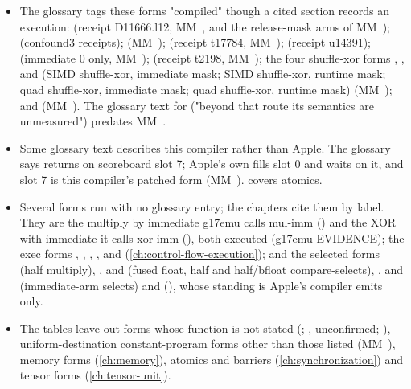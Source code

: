 \begin{itemize}
\item The glossary tags these forms "compiled" though a cited section records
  an execution:  (receipt D11666.l12, MM~, and the release-mask arms of MM~);
   (confound3 receipts);  (MM~);
   (receipt t17784, MM~);  (receipt u14391);  (immediate 0 only, MM~);  (receipt
  t2198, MM~); the four shuffle-xor forms , ,  and  (SIMD shuffle-xor, immediate mask;
  SIMD shuffle-xor, runtime mask; quad shuffle-xor, immediate mask; quad shuffle-xor, runtime mask) (MM~); and
   (MM~). The glossary text for  ("beyond that route its semantics are
  unmeasured") predates MM~.
\item Some glossary text describes this compiler rather than Apple. The glossary says  returns on scoreboard slot 7; Apple's own  fills slot 0 and waits on it, and slot 7 is this compiler's
  patched form (MM~).  covers atomics.
\item Several forms run with no glossary entry; the chapters cite them by label. They are the multiply by immediate g17emu calls
  mul-imm () and the XOR with immediate it calls xor-imm (), both executed (g17emu EVIDENCE); the exec forms
  , , , ,  and  (\cref{ch:control-flow-execution}); and the selected forms  (half multiply), ,  and
   (fused float, half and half/bfloat compare-selects), ,  and  (immediate-arm selects) and
   (), whose standing is Apple's compiler emits only.
\item The tables leave out forms whose function is not stated (; , unconfirmed; ), uniform-destination
  constant-program forms other than those listed (MM~), memory forms (\cref{ch:memory}), atomics and barriers (\cref{ch:synchronization}) and
  tensor forms (\cref{ch:tensor-unit}).
\end{itemize}
